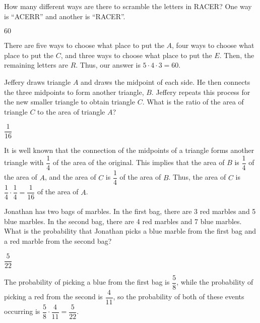 \documentclass[11pt]{article}
\begin{document}
\begin{problem}
How many different ways are there to scramble the letters in RACER? One way is ``ACERR'' and another is ``RACER''.
\end{problem}

\begin{answer}
$60$
\end{answer}

\begin{solution}
There are five ways to choose what place to put the $A$, four ways to choose what place to put the $C$, and three ways to choose what place to put the $E$. Then, the remaining letters are $R$. Thus, our answer is $5 \cdot 4 \cdot 3 = \boxed{60}$.
\end{solution}


\begin{problem}
Jeffery draws triangle $A$ and draws the midpoint of each side. 
He then connects the three midpoints to form another triangle, $B$.
Jeffery repeats this process for the new smaller triangle to obtain triangle $C$. 
What is the ratio of the area of triangle $C$ to the area of triangle $A$? 
\end{problem}

\begin{answer}
$\dfrac{1}{16}$
\end{answer}

\begin{solution}
It is well known that the connection of the midpoints of a triangle forms another triangle with $\dfrac{1}{4}$ of the area of the original. 
This implies that the area of $B$ is $\dfrac{1}{4}$ of the area of $A$, and the area of $C$ is $\dfrac{1}{4}$ of the area of $B$. 
Thus, the area of $C$ is $\dfrac{1}{4} \cdot \dfrac{1}{4} = \boxed{\dfrac{1}{16}}$ of the area of $A$. 
\end{solution}


\begin{problem}
Jonathan has two bags of marbles. In the first bag, there are 3 red marbles and 5 blue marbles. In the second bag, there are 4 red marbles and 7 blue marbles. What is the probability that Jonathan picks a blue marble from the first bag and a red marble from the second bag?
\end{problem}

\begin{answer}
$\dfrac{5}{22}$
\end{answer}

\begin{solution}
The probability of picking a blue from the first bag is $\dfrac{5}{8}$, while the probability of picking a red from the second is $\dfrac{4}{11}$, 
so the probability of both of these events occurring is $\dfrac{5}{8} \cdot \dfrac{4}{11} = \boxed{\dfrac{5}{22}}$.
\end{solution}
\end{document}
